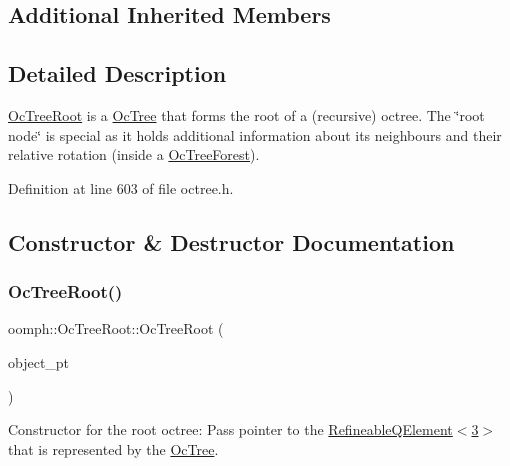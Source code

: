 \subsection*{Additional Inherited Members}


\subsection{Detailed Description}
\hyperlink{classoomph_1_1OcTreeRoot}{Oc\+Tree\+Root} is a \hyperlink{classoomph_1_1OcTree}{Oc\+Tree} that forms the root of a (recursive) octree. The \char`\"{}root node\char`\"{} is special as it holds additional information about its neighbours and their relative rotation (inside a \hyperlink{classoomph_1_1OcTreeForest}{Oc\+Tree\+Forest}). 

Definition at line 603 of file octree.\+h.



\subsection{Constructor \& Destructor Documentation}
\mbox{\label{classoomph_1_1OcTreeRoot_a594278fd254e72415e1523b1b8e7273d}} 
\subsubsection{\texorpdfstring{Oc\+Tree\+Root()}{OcTreeRoot()}\hspace{0.1cm}{\footnotesize\ttfamily [1/2]}}
{\footnotesize\ttfamily oomph\+::\+Oc\+Tree\+Root\+::\+Oc\+Tree\+Root (\begin{DoxyParamCaption}\item[{\hyperlink{classoomph_1_1RefineableElement}{Refineable\+Element} $\ast$const \&}]{object\+\_\+pt }\end{DoxyParamCaption})\hspace{0.3cm}{\ttfamily [inline]}}



Constructor for the root octree\+: Pass pointer to the \hyperlink{classoomph_1_1RefineableQElement_3_013_01_4}{Refineable\+Q\+Element$<$3$>$} that is represented by the \hyperlink{classoomph_1_1OcTree}{Oc\+Tree}. 



